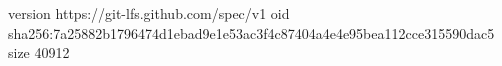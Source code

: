 version https://git-lfs.github.com/spec/v1
oid sha256:7a25882b1796474d1ebad9e1e53ac3f4c87404a4e4e95bea112cce315590dac5
size 40912
